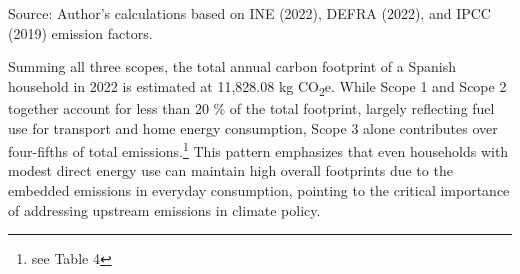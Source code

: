 \documentclass[12pt,a4paper]{article}%
\begin{document}
\begin{table}[h]
\centering
\captionsetup{justification=raggedright,singlelinecheck=false} 
\caption{\small Consumption-Based Emissions (Scope 3)}\label{tab:scope3}
\raggedright

\vspace{0.3cm}
\footnotesize{Source: Author's calculations based on INE (2022), DEFRA (2022), and IPCC (2019) emission factors.}
\end{table}

Summing all three scopes, the total annual carbon footprint of a Spanish household in 2022 is estimated at 11,828.08 kg CO\textsubscript{2}e. While Scope 1 and Scope 2 together account for less than 20 \% of the total footprint, largely reflecting fuel use for transport and home energy consumption, Scope 3 alone contributes over four-fifths of total emissions.\footnote{see Table 4} This pattern emphasizes that even households with modest direct energy use can maintain high overall footprints due to the embedded emissions in everyday consumption, pointing to the critical importance of addressing upstream emissions in climate policy.
\end{document}
